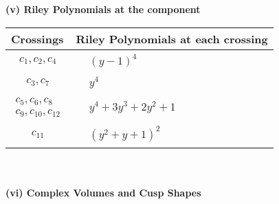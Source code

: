\documentclass[1p]{elsarticle_modified}
\theoremstyle{definition}
\begin{document}
\newpage\renewcommand{\arraystretch}{1}
\flushleft \textbf{(v) Riley Polynomials at the component}\newline \\
\begin{tabular}{m{50pt}|m{274pt}}
Crossings & \hspace{64pt}Riley Polynomials at each crossing \\
\hline $$\begin{aligned}c_{1},c_{2},c_{4}\end{aligned}$$&$\begin{aligned}
&(y-1)^4
\end{aligned}$\\
\hline $$\begin{aligned}c_{3},c_{7}\end{aligned}$$&$\begin{aligned}
&y^4
\end{aligned}$\\
\hline $$\begin{aligned}c_{5},c_{6},c_{8}\\c_{9},c_{10},c_{12}\end{aligned}$$&$\begin{aligned}
&y^4+3 y^3+2 y^2+1
\end{aligned}$\\
\hline $$\begin{aligned}c_{11}\end{aligned}$$&$\begin{aligned}
&(y^2+y+1)^2
\end{aligned}$\\
\hline
\end{tabular}\\~\\
\newpage\flushleft \textbf{(vi) Complex Volumes and Cusp Shapes}
\end{document}
